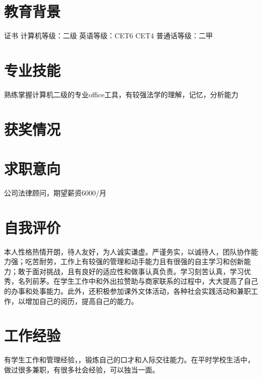 \documentclass{uniquecv}
\begin{document}

\medskip



\section{教育背景}
证书 \quad 计算机等级：二级 \quad 英语等级：CET6 CET4 \quad 普通话等级：二甲 



\section{专业技能}
\smallskip
熟练掌握计算机二级的专业office工具，有较强法学的理解，记忆，分析能力


\section{获奖情况}
\medskip

\section{求职意向}
公司法律顾问，期望薪资6000/月
\section{自我评价}
本人性格热情开朗，待人友好，为人诚实谦虚。严谨务实，以诚待人，团队协作能力强；吃苦耐劳，工作上有较强的管理和动手能力且有很强的自主学习和创新能力；敢于面对挑战，且有良好的适应性和做事认真负责。学习刻苦认真，学习优秀，名列前茅。在学生工作中和外出拉赞助与商家联系的过程中，大大提高了自己的办事和处事能力。此外，还积极参加课外文体活动，各种社会实践活动和兼职工作，以增加自己的阅历，提高自己的能力。
\section{工作经验}
有学生工作和管理经验，，锻炼自己的口才和人际交往能力。在平时学校生活中，做过很多兼职，有很多社会经验，可以独当一面。
\end{document}
